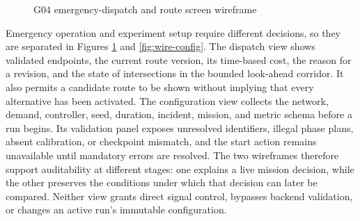 \begin{figure}[htbp]
\centering
{}
\caption{G04 emergency-dispatch and route screen wireframe}
\label{fig:wire-dispatch}
\end{figure}

Emergency operation and experiment setup require different decisions, so they are separated in Figures \ref{fig:wire-dispatch} and \ref{fig:wire-config}. The dispatch view shows validated endpoints, the current route version, its time-based cost, the reason for a revision, and the state of intersections in the bounded look-ahead corridor. It also permits a candidate route to be shown without implying that every alternative has been activated. The configuration view collects the network, demand, controller, seed, duration, incident, mission, and metric schema before a run begins. Its validation panel exposes unresolved identifiers, illegal phase plans, absent calibration, or checkpoint mismatch, and the start action remains unavailable until mandatory errors are resolved. The two wireframes therefore support auditability at different stages: one explains a live mission decision, while the other preserves the conditions under which that decision can later be compared. Neither view grants direct signal control, bypasses backend validation, or changes an active run's immutable configuration.

